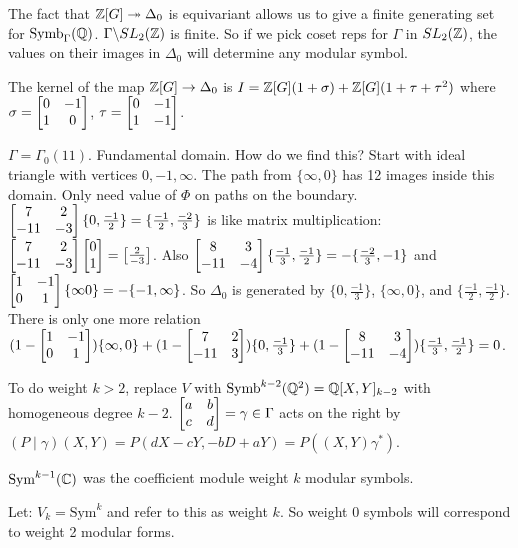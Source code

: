 \documentclass[]{article}
\begin{document}
The fact that $\mathbb{Z}[G] \twoheadrightarrow \Delta_0$ is equivariant allows us to give a finite generating set for $\text{Symb}_\Gamma(\mathbb{Q})$. $\Gamma \backslash SL_2(\mathbb{Z})$ is finite. So if we pick coset reps for $\Gamma$ in $SL_2(\mathbb{Z})$, the values on their images in $\Delta_0$ will determine any modular symbol.

\begin{theorem}
	[Manin] The kernel of the map $\mathbb{Z}[G] \rightarrow \Delta_0$ is $I = \mathbb{Z}[G](1+\sigma) + \mathbb{Z}[G](1+\tau+\tau^2)$ where $\sigma = \begin{bmatrix}0&-1\\1&0\end{bmatrix}$, $\tau = \begin{bmatrix}0&-1\\1&-1\end{bmatrix}$.
\end{theorem}

\begin{example}
	$\Gamma = \Gamma_0(11)$. Fundamental domain. How do we find this? Start with ideal triangle with vertices $0,-1,\infty$. The path from $\{\infty,0\}$ has 12 images inside this domain. Only need value of $\Phi$ on paths on the boundary. $\begin{bmatrix}7&2 \\ -11&-3\end{bmatrix} \{0,\frac{-1}{2}\} = \{\frac{-1}{2},\frac{-2}{3}\}$ is like matrix multiplication: $\begin{bmatrix}7&2 \\ -11&-3\end{bmatrix} \begin{bmatrix}0\\1\end{bmatrix} = \begin{bmatrix}\frac{2}{-3}\end{bmatrix}$. Also $\begin{bmatrix}8&3\\-11&-4\end{bmatrix} \{\frac{-1}{3},\frac{-1}{2}\} = -\{\frac{-2}{3},-1\}$ and $\begin{bmatrix}1&-1\\0&1\end{bmatrix}\{\infty0\} = -\{-1,\infty\}$.
	So $\Delta_0$ is generated by $\{0,\frac{-1}{3}\}$, $\{\infty,0\}$, and $\{\frac{-1}{2},\frac{-1}{2}\}$.
	There is only one more relation $(1-\begin{bmatrix}1&-1\\0&1\end{bmatrix}) \{\infty,0\} + (1-\begin{bmatrix}7&2\\-11&3\end{bmatrix}) \{0,\frac{-1}{3}\} + (1-\begin{bmatrix}8&3\\-11&-4\end{bmatrix}) \{\frac{-1}{3},\frac{-1}{2}\} = 0$.
\end{example}

To do weight $k>2$, replace $V$ with $\text{Symb}^{k-2}(\mathbb{Q}^2) = \mathbb{Q}[X,Y]_{k-2}$ with homogeneous degree $k-2$. $\begin{bmatrix}a&b\\c&d\end{bmatrix} = \gamma \in \Gamma$ acts on the right by $(P\mid \gamma)(X,Y) = P(dX-cY,-bD+aY) = P((X,Y)\gamma^*)$.

\begin{recall}
	\ul{$\text{Sym}^{k-1}(\mathbb{C})$} was the coefficient module weight $k$ modular symbols.
\end{recall}
Let: $V_k = \text{Sym}^k$ and refer to this as weight $k$. So weight 0 symbols will correspond to weight 2 modular forms.
\end{document}
